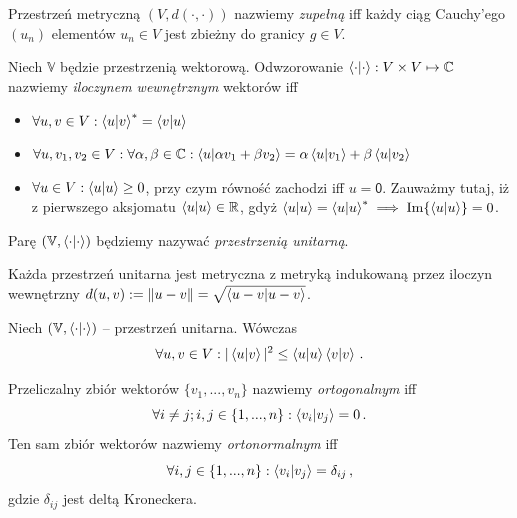 \documentclass{myclass}
\begin{document}
\begin{definition}
Przestrzeń metryczną \((V,d(\cdot,\cdot))\) nazwiemy \textit{zupełną} iff każdy ciąg Cauchy'ego
\((u_n)\) elementów \(u_n \in V\) jest zbieżny do granicy \(g \in V\).
\end{definition}

\begin{definition}
Niech \(\mathbb{V}\) będzie przestrzenią wektorową. Odwzorowanie \(\braket{\cdot} : V \times V
\mapsto \mathbb{C}\) nazwiemy \textit{iloczynem wewnętrznym} wektorów iff
\begin{itemize}
    
    \item \(\forall u,v \in V : \braket{u}{v}^* = \braket{v}{u}\)
    
    \item \(\forall u,v_1,v_2 \in V : \forall \alpha, \beta \in \mathbb{C} : \braket{u}{\alpha v_1 +
    \beta v_2} = \alpha \braket{u}{v_1} + \beta \braket{u}{v_2}\)

    \item \(\forall u \in V : \braket{u} \geq 0\), przy czym równość zachodzi iff \(u =
    \mathsf{0}\). Zauważmy tutaj, iż z pierwszego aksjomatu \(\braket{u} \in \mathbb{R}\), gdyż
    \(\braket{u} = \braket{u}^* \implies \Im{\braket{u}} = 0\). 

\end{itemize}
Parę \((\mathbb{V},\braket{\cdot})\) będziemy nazywać \textit{przestrzenią unitarną}.
\end{definition}

\begin{theorem}
Każda przestrzeń unitarna jest metryczna z metryką indukowaną przez iloczyn wewnętrzny \(d(u,v) :=
\norm{u - v} = \sqrt{\braket{u-v}}\).
\end{theorem}

\begin{theorem}
Niech \((\mathbb{V},\braket{\cdot})\) -- przestrzeń unitarna. Wówczas
\begin{equation*}
    \forall u,v \in V : |\braket{u}{v}|^2 \leq \braket{u}\braket{v}\,.
\end{equation*}  
\end{theorem}

\begin{definition}
Przeliczalny zbiór wektorów \(\{v_1,...,v_n\}\) nazwiemy \textit{ortogonalnym} iff 
\begin{equation*}
    \forall i\neq j; i,j\in\{1,...,n\} : \braket{v_i}{v_j} = 0\,.
\end{equation*}
Ten sam zbiór wektorów nazwiemy \textit{ortonormalnym} iff 
\begin{equation*}
    \forall i,j\in\{1,...,n\} : \braket{v_i}{v_j} = \delta_{ij}\,,
\end{equation*}
gdzie \(\delta_{ij}\) jest deltą Kroneckera.
\end{definition}
\end{document}
